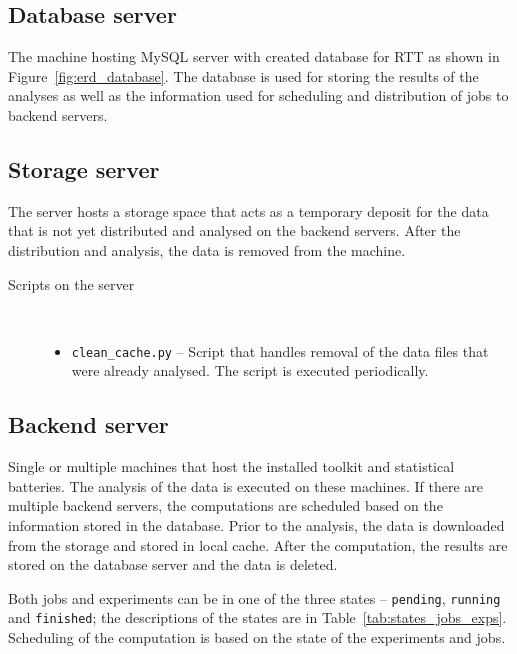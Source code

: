 \documentclass[
	digital,    %
	oneside,    %
	color,
	11pt,
	nocover,
	notable,
	nolof,
	nolot,
]{fithesis3}
\newenvironment{titlemize}[1]
{
	\begin{description}
	\item[#1]\
	\begin{itemize}
}
{
	\end{itemize}
 	\end{description}
}
\theoremstyle{definition}
\theoremstyle{remark}
\begin{document}
\subsection{Database server}
The machine hosting MySQL server with created database for RTT as shown in Figure~\ref{fig:erd_database}. The database is used for storing the results of the analyses as well as the information used for scheduling and distribution of jobs to backend servers.

\subsection{Storage server}
The server hosts a storage space that acts as a temporary deposit for the data that is not yet distributed and analysed on the backend servers. After the distribution and analysis, the data is removed from the machine.

\pagebreak
\begin{titlemize}{Scripts on the server}
\item \texttt{clean\_cache.py} -- Script that handles removal of the data files that were already analysed. The script is executed periodically.
\end{titlemize}

\subsection{Backend server}
Single or multiple machines that host the installed toolkit and statistical batteries. The analysis of the data is executed on these machines. If there are multiple backend servers, the computations are scheduled based on the information stored in the database. Prior to the analysis, the data is downloaded from the storage and stored in local cache. After the computation, the results are stored on the database server and the data is deleted.

Both jobs and experiments can be in one of the three states -- \texttt{pending}, \texttt{running} and \texttt{finished}; the descriptions of the states are in Table~\ref{tab:states_jobs_exps}. Scheduling of the computation is based on the state of the experiments and jobs.
\end{document}
